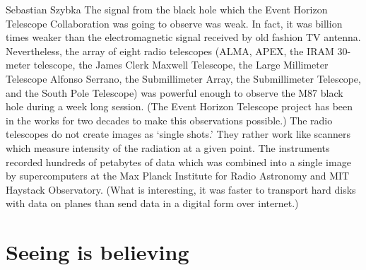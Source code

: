 \begin{artengenv}{Sebastian Szybka}
The signal from the black hole which the Event Horizon Telescope Collaboration was going to observe was weak. In fact, it was billion times weaker than the electromagnetic signal received by old fashion TV antenna. Nevertheless, the array of eight radio telescopes (ALMA, APEX, the IRAM 30-meter telescope, the James Clerk Maxwell Telescope, the Large Millimeter Telescope Alfonso Serrano, the Submillimeter Array, the Submillimeter Telescope, and the South Pole Telescope) was powerful enough to observe the M87 black hole during a week long session. (The Event Horizon Telescope project has been in the works for two decades to make this observations possible.) The radio telescopes do not create images as `single shots.' They rather work like scanners which measure intensity of the radiation at a given point. The instruments recorded hundreds of petabytes of data which was combined into a single image by supercomputers at the Max Planck Institute for Radio Astronomy and MIT Haystack Observatory. (What is interesting, it was faster to transport hard disks with data on planes than send data in a digital form over internet.) 

\section{Seeing is believing}


\end{artengenv}
